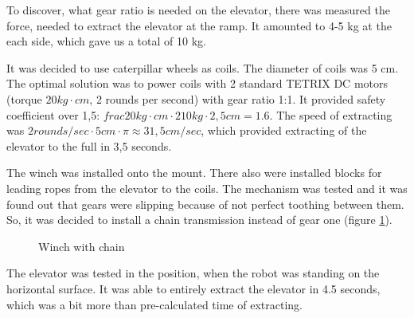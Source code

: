 \begin{enumerate*}
  \item To discover, what gear ratio is needed on the elevator, there was measured the force, needed to extract the elevator at the ramp. It amounted to 4-5 kg at the each side, which gave us a total of 10 kg.

  It was decided to use caterpillar wheels as coils. The diameter of coils was 5 cm. The optimal solution was to power coils with 2 standard TETRIX DC motors (torque $20 kg \cdot cm$, 2 rounds per second) with gear ratio 1:1. It provided safety coefficient over 1,5: $frac{20 kg \cdot cm \cdot 2}{10 kg \cdot 2,5 cm} = 1.6$. The speed of extracting was $2 rounds / sec \cdot 5 cm \cdot \pi \approx 31,5 cm / sec$, which provided extracting of the elevator to the full in 3,5 seconds.

  \item The winch was installed onto the mount. There also were installed blocks for leading ropes from the elevator to the coils. The mechanism was tested and it was found out that gears were slipping because of not perfect toothing between them. So, it was decided to install a chain transmission instead of gear one (figure \ref{Elevator1003}).
  
  \begin{figure}[H]
  	\begin{minipage}[h]{1\linewidth}
  		\caption{Winch with chain}
  		\label{Elevator1003}
  	\end{minipage}
  \end{figure}

  \item The elevator was tested in the position, when the robot was standing on the horizontal surface. It was able to entirely extract the elevator in 4.5 seconds, which was a bit more than pre-calculated time of extracting.


\end{enumerate*}
